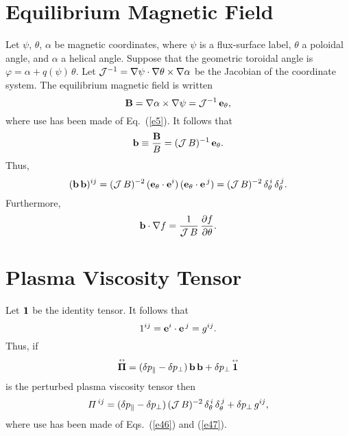 \documentclass[12pt,prb,aps,notitlepage]{revtex4-1}
\newcommand{\bPi}{\mbox{\boldmath$\Pi$}}
\newcommand{\smalltensor}[1]{\overset{\text{\tiny$\leftrightarrow$}}{#1}}
\begin{document}
\section{Equilibrium Magnetic Field}
Let $\psi$, $\theta$, $\alpha$ be magnetic coordinates, where $\psi$ is a flux-surface label, $\theta$ a poloidal angle, and $\alpha$
a helical angle. Suppose that the geometric toroidal angle is $\varphi = \alpha+ q(\psi)\,\theta$. 
 Let ${\cal  J}^{-1}= \nabla\psi\cdot\nabla\theta\times \nabla\alpha$ be the Jacobian of the coordinate system. The equilibrium magnetic field
is written 
\begin{equation}\label{e44}
{\bf B} =  \nabla\alpha\times\nabla\psi={\cal J}^{-1}\,{\bf e}_\theta,
\end{equation}
where use has been made of Eq.~(\ref{e5}). 
It follows that 
\begin{equation}\label{e45}
{\bf b} \equiv \frac{{\bf B}}{B}= ({\cal J}\,B)^{-1}\,{\bf e}_\theta.
\end{equation}
Thus,
\begin{equation}\label{e46}
({\bf b}\,{\bf b})^{ij}= ({\cal J}\,B)^{-2} \,({\bf e}_\theta\cdot{\bf e}^i)\,({\bf e}_\theta\cdot{\bf e}^{\,j})=  ({\cal J}\,B)^{-2} \,\delta_\theta^{\,i}\,\delta_\theta^{\,j}.
\end{equation}
Furthermore,
\begin{equation}\label{e48a}
{\bf b}\cdot\nabla f = \frac{1}{{\cal J}\,B}\,\frac{\partial f}{\partial\theta}.
\end{equation}

\section{Plasma Viscosity Tensor}
Let ${\bf 1}$ be the identity tensor. It follows that
\begin{equation}\label{e47}
1^{ij}= {\bf e}^i\cdot{\bf e}^{\,j} = g^{ij}.
\end{equation}
Thus, if 
\begin{equation}
\smalltensor{\bPi}= (\delta p_\parallel-\delta p_\perp)\,{\bf b}\,{\bf b} + \delta p_\perp\,\smalltensor{\bf 1}
\end{equation}
is the perturbed plasma viscosity tensor then
\begin{equation}\label{e48}
{\mit\Pi}^{\,ij} = (\delta p_\parallel-\delta p_\perp)\,({\cal J}\,B)^{-2} \,\delta_\theta^{\,i}\,\delta_\theta^{\,j} +\delta p_\perp\,g^{ij},
\end{equation}
where use has been made of Eqs.~(\ref{e46}) and (\ref{e47}). 
\end{document}
